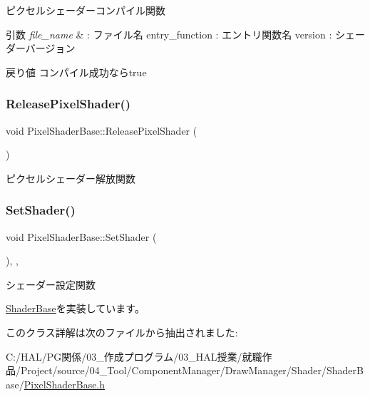 ピクセルシェーダーコンパイル関数 


\begin{DoxyParams}{引数}
{\em file\+\_\+name} & \+: ファイル名 entry\+\_\+function \+: エントリ関数名 version \+: シェーダーバージョン \\
\hline
\end{DoxyParams}
\begin{DoxyReturn}{戻り値}
コンパイル成功ならtrue 
\end{DoxyReturn}
\mbox{\label{class_pixel_shader_base_a8e00c19f5ece0a08762442f355195591}} 
\subsubsection{\texorpdfstring{Release\+Pixel\+Shader()}{ReleasePixelShader()}}
{\footnotesize\ttfamily void Pixel\+Shader\+Base\+::\+Release\+Pixel\+Shader (\begin{DoxyParamCaption}{ }\end{DoxyParamCaption})\hspace{0.3cm}{\ttfamily [inline]}}



ピクセルシェーダー解放関数 

\mbox{\label{class_pixel_shader_base_a73f41bda5cbb9309ad415cdc471954a2}} 
\subsubsection{\texorpdfstring{Set\+Shader()}{SetShader()}}
{\footnotesize\ttfamily void Pixel\+Shader\+Base\+::\+Set\+Shader (\begin{DoxyParamCaption}{ }\end{DoxyParamCaption})\hspace{0.3cm}{\ttfamily [inline]}, {\ttfamily [override]}, {\ttfamily [virtual]}}



シェーダー設定関数 



\mbox{\hyperlink{class_shader_base_af45063254b80602db8626360d643baee}{Shader\+Base}}を実装しています。



このクラス詳解は次のファイルから抽出されました\+:\begin{DoxyCompactItemize}
\item 
C\+:/\+H\+A\+L/\+P\+G関係/03\+\_\+作成プログラム/03\+\_\+\+H\+A\+L授業/就職作品/\+Project/source/04\+\_\+\+Tool/\+Component\+Manager/\+Draw\+Manager/\+Shader/\+Shader\+Base/\mbox{\hyperlink{_pixel_shader_base_8h}{Pixel\+Shader\+Base.\+h}}\end{DoxyCompactItemize}
